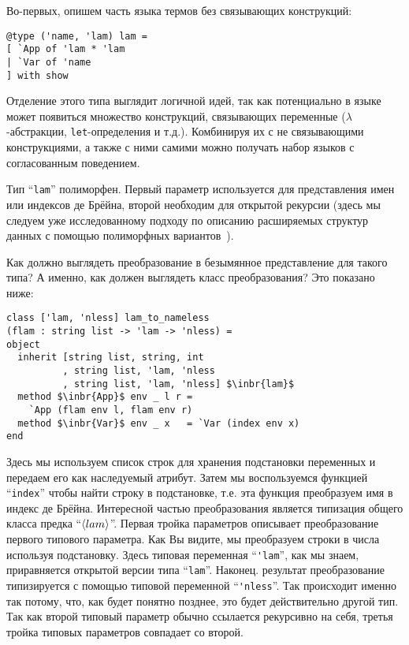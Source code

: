 Во-первых, опишем часть языка термов без связывающих конструкций:

\begin{lstlisting}
@type ('name, 'lam) lam = 
[ `App of 'lam * 'lam
| `Var of 'name
] with show
\end{lstlisting}

Отделение этого типа выглядит логичной идей, так как потенциально в языке может появиться множество конструкций, связывающих переменные 
($\lambda$-абстракции, \lstinline=let=-определения и т.д.). Комбинируя их с не связывающими конструкциями, а также с ними самими можно получать набор языков с согласованным поведением.

Тип ``\lstinline{lam}'' полиморфен. Первый параметр используется для представления имен или индексов де Брёйна, второй необходим для открытой рекурсии (здесь мы следуем уже исследованному подходу по описанию расширяемых структур данных с помощью полиморфных 
вариантов~\cite{PolyVarReuse}).

Как должно выглядеть преобразование в безымянное представление для такого типа? А именно, как должен выглядеть класс преобразования? Это показано ниже:

\begin{lstlisting}
class ['lam, 'nless] lam_to_nameless
(flam : string list -> 'lam -> 'nless) =
object
  inherit [string list, string, int
          , string list, 'lam, 'nless
          , string list, 'lam, 'nless] $\inbr{lam}$
  method $\inbr{App}$ env _ l r = 
    `App (flam env l, flam env r)
  method $\inbr{Var}$ env _ x   = `Var (index env x)
end
\end{lstlisting}


Здесь мы используем список строк для хранения подстановки переменных и  передаем его как наследуемый атрибут. Затем мы воспользуемся функцией 
``\lstinline{index}'' чтобы найти строку в подстановке, т.е.  эта функция преобразуем имя в индекс де Брёйна. 
Интересной частью преобразования является типизация общего класса предка ``$\left<lam\right>$''. 
Первая тройка параметров описывает преобразование первого типового параметра. Как Вы видите, мы преобразуем строки в числа используя подстановку.
Здесь типовая переменная ``\lstinline{'lam}'', как мы знаем, приравняется открытой версии типа ``\lstinline{lam}''.
Наконец. результат преобразование типизируется с помощью типовой переменной ``\lstinline{'nless}''. 
Так происходит именно так потому, что, как будет понятно позднее,  это будет действительно другой тип.
Так как второй типовый параметр обычно ссылается рекурсивно на себя, третья тройка типовых параметров совпадает со второй.

